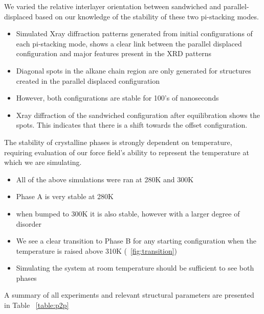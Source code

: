 \documentclass{article}
\begin{document}
	We varied the relative interlayer orientation between sandwiched and parallel-displaced based on our knowledge of the stability of these two pi-stacking modes.
        \begin{itemize}
		\item Simulated Xray diffraction patterns generated from initial configurations of each pi-stacking mode, shows a 
clear link between the parallel displaced configuration and major features present in the XRD patterns %
		\item Diagonal spots in the alkane chain region are only generated for structures created in the parallel displaced configuration
		\item However, both configurations are stable for 100's of nanoseconds
		\item Xray diffraction of the sandwiched configuration after equilibration shows the spots. This indicates that there is a shift towards the offset configuration.
	\end{itemize} 

	The stability of crystalline phases is strongly dependent on temperature, requiring evaluation of our force field's ability to represent the temperature at which we are simulating.
	\begin{itemize}
		\item All of the above simulations were ran at 280K and 300K
		\item Phase A is very stable at 280K
		\item when bumped to 300K it is also stable, however with a larger degree of disorder %
		\item We see a clear transition to Phase B for any starting configuration when the temperature is raised above 310K (~\ref{fig:transition})
		\item Simulating the system at room temperature should be sufficient to see both phases
	\end{itemize}

	A summary of all experiments and relevant structural parameters are presented in Table ~\ref{table:p2p}
\end{document}
